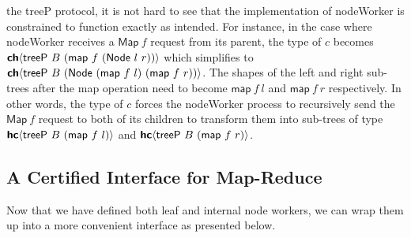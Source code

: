 the \textsf{treeP} protocol, it is not hard to see that the implementation of
\textsf{nodeWorker} is constrained to function exactly as intended. For instance,
in the case where \textsf{nodeWorker} receives a $\textsf{Map}\ f$ request from
its parent, the type of $c$ becomes $\CH{\textsf{treeP}\ B\ (\textsf{map}\ f\ (\textsf{Node}\ l\ r))}$
which simplifies to $\CH{\textsf{treeP}\ B\ (\textsf{Node}\ (\textsf{map}\ f\ l)\ (\textsf{map}\ f\ r))}$.
The shapes of the left and right sub-trees after the map operation need to become
$\textsf{map}\ f\ l$ and $\textsf{map}\ f\ r$ respectively. In other words, the
type of $c$ forces the \textsf{nodeWorker} process to recursively send the
$\textsf{Map}\ f$ request to both of its children to transform them into
sub-trees of type $\HC{\textsf{treeP}\ B\ (\textsf{map}\ f\ l)}$ and
$\HC{\textsf{treeP}\ B\ (\textsf{map}\ f\ r)}$.

\subsection{A Certified Interface for Map-Reduce}
Now that we have defined both leaf and internal node workers, we can wrap them
up into a more convenient interface as presented below.

